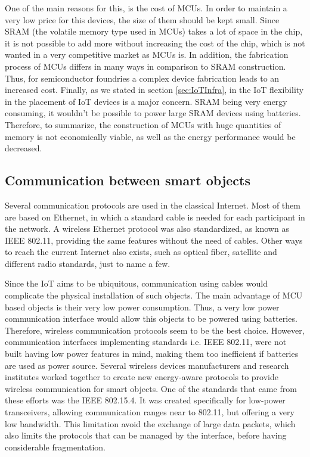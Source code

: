 One of the main reasons for this, is the cost of MCUs.
In order to maintain a very low price for this devices, the size of them should be kept small.
Since SRAM (the volatile memory type used in MCUs) takes a lot of space in the chip, it is not possible to add more without increasing the cost of the chip, which is not wanted in a very competitive market as MCUs is.
In addition, the fabrication process of MCUs differs in many ways in comparison to SRAM construction.
Thus, for semiconductor foundries a complex device fabrication leads to an increased cost.
Finally, as we stated in section \ref{sec:IoTInfra}, in the IoT flexibility in the placement of IoT devices is a major concern.
SRAM being very energy consuming, it wouldn't be possible to power large SRAM devices using batteries.
Therefore, to summarize, the construction of MCUs with huge quantities of memory is not economically viable, as well as the energy performance would be decreased.

\subsection{Communication between smart objects}
Several communication protocols are used in the classical Internet.
Most of them are based on Ethernet\cite{ieee802.3}, in which a standard cable is needed for each participant in the network.
A wireless Ethernet protocol was also standardized, as known as IEEE 802.11\cite{ieee802.11}, providing the same features without the need of cables.
Other ways to reach the current Internet also exists, such as optical fiber, satellite and different radio standards, just to name a few.

Since the IoT aims to be ubiquitous, communication using cables would complicate the physical installation of such objects.
The main advantage of MCU based objects is their very low power consumption.
Thus, a very low power communication interface would allow this objects to be powered using batteries.
Therefore, wireless communication protocols seem to be the best choice.
However, communication interfaces implementing standards i.e. IEEE 802.11, were not built having low power features in mind, making them too inefficient if batteries are used as power source.
Several wireless devices manufacturers and research institutes worked together to create new energy-aware protocols to provide wireless communication for smart objects.
One of the standards that came from these efforts was the IEEE 802.15.4\cite{ieee802.15.4}.
It was created specifically for low-power transceivers, allowing communication ranges near to 802.11, but offering a very low bandwidth.
This limitation avoid the exchange of large data packets, which also limits the protocols that can be managed by the interface, before having considerable fragmentation.


